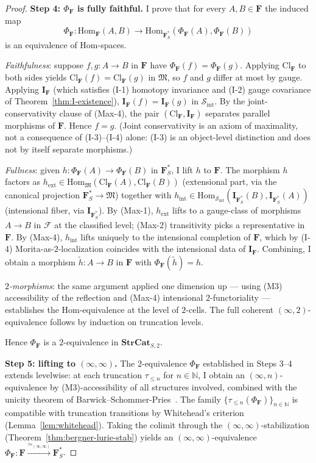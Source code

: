 \documentclass[11pt]{article}
\theoremstyle{plain}
\theoremstyle{definition}
\newcommand{\cS}{\mathcal{S}}
\newcommand{\cF}{\mathcal{F}}
\newcommand{\fM}{\mathfrak{M}}
\newcommand{\Sint}{\cS_{\mathrm{int}}}
\newcommand{\Hom}{\mathrm{Hom}}
\newcommand{\Cl}{\mathrm{Cl}}
\newcommand{\II}{\mathbf{I}}
\begin{document}
\begin{proof}
\textbf{Step 4: $\Phi_\mathbf{F}$ is fully faithful.} I prove that for every $A, B \in \mathbf{F}$ the induced map
\[ \Phi_\mathbf{F} : \Hom_\mathbf{F}(A, B) \longrightarrow \Hom_{\mathbf{F}_S^*}(\Phi_\mathbf{F}(A), \Phi_\mathbf{F}(B)) \]
is an equivalence of Hom-spaces.

\emph{Faithfulness}: suppose $f, g : A \to B$ in $\mathbf{F}$ have $\Phi_\mathbf{F}(f) = \Phi_\mathbf{F}(g)$. Applying $\Cl_\mathbf{F}$ to both sides yields $\Cl_\mathbf{F}(f) = \Cl_\mathbf{F}(g)$ in $\fM$, so $f$ and $g$ differ at most by gauge. Applying $\II_\mathbf{F}$ (which satisfies (I-1) homotopy invariance and (I-2) gauge covariance of Theorem~\ref{thm:I-existence}), $\II_\mathbf{F}(f) = \II_\mathbf{F}(g)$ in $\Sint$. By the joint-conservativity clause of (Max-4), the pair $(\Cl_\mathbf{F}, \II_\mathbf{F})$ separates parallel morphisms of $\mathbf{F}$. Hence $f = g$. (Joint conservativity is an axiom of maximality, not a consequence of (I-3)--(I-4) alone: (I-3) is an object-level distinction and does not by itself separate morphisms.)

\emph{Fullness}: given $h : \Phi_\mathbf{F}(A) \to \Phi_\mathbf{F}(B)$ in $\mathbf{F}_S^*$, I lift $h$ to $\mathbf{F}$. The morphism $h$ factors as $h_{\mathrm{ext}} \in \Hom_\fM(\Cl_\mathbf{F}(A), \Cl_\mathbf{F}(B))$ (extensional part, via the canonical projection $\mathbf{F}_S^* \to \fM$) together with $h_{\mathrm{int}} \in \Hom_{\Sint}(\II_{\mathbf{F}_S^*}(B), \II_{\mathbf{F}_S^*}(A))$ (intensional fiber, via $\II_{\mathbf{F}_S^*}$). By (Max-1), $h_{\mathrm{ext}}$ lifts to a gauge-class of morphisms $A \to B$ in $\cF$ at the classified level; (Max-2) transitivity picks a representative in $\mathbf{F}$. By (Max-4), $h_{\mathrm{int}}$ lifts uniquely to the intensional completion of $\mathbf{F}$, which by (I-4) Morita-as-$2$-localization coincides with the intensional data of $\II_\mathbf{F}$. Combining, I obtain a morphism $\tilde h : A \to B$ in $\mathbf{F}$ with $\Phi_\mathbf{F}(\tilde h) = h$.

\emph{$2$-morphisms}: the same argument applied one dimension up --- using (M3) accessibility of the reflection and (Max-4) intensional $2$-functoriality --- establishes the Hom-equivalence at the level of $2$-cells. The full coherent $(\infty, 2)$-equivalence follows by induction on truncation levels.

Hence $\Phi_\mathbf{F}$ is a $2$-equivalence in $\mathbf{StrCat}_{S, 2}$.

\textbf{Step 5: lifting to $(\infty, \infty)$.} The $2$-equivalence $\Phi_\mathbf{F}$ established in Steps 3--4 extends levelwise: at each truncation $\tau_{\leq n}$ for $n \in \mathbb{N}$, I obtain an $(\infty, n)$-equivalence by (M3)-accessibility of all structures involved, combined with the unicity theorem of Barwick--Schommer-Pries~\cite{BarwickSchommerPries2021}. The family $\{\tau_{\leq n}(\Phi_\mathbf{F})\}_{n \in \mathbb{N}}$ is compatible with truncation transitions by Whitehead's criterion (Lemma~\ref{lem:whitehead}). Taking the colimit through the $(\infty, \infty)$-stabilization (Theorem~\ref{thm:bergner-lurie-stab}) yields an $(\infty, \infty)$-equivalence $\Phi_\mathbf{F} : \mathbf{F} \xrightarrow{\simeq_{(\infty, \infty)}} \mathbf{F}_S^*$.


\end{proof}
\end{document}
